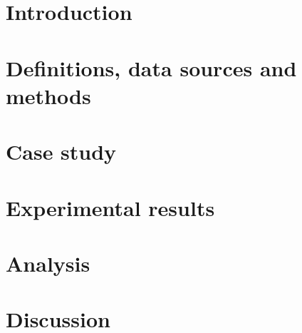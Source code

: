 \minitoc

\section{Introduction}
\label{sec:testability:intro}


\section{Definitions, data sources and methods}
\label{sec:testability:methodology}


\section{Case study}
\label{sec:testability:case-study}


\section{Experimental results}
\label{sec:testability:results}


\section{Analysis}
\label{sec:testability:analysis}


\section{Discussion}
\label{sec:testability:discussion}


% 